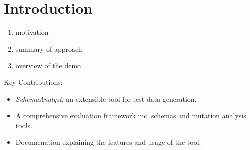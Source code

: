 \section{Introduction}

\begin{enumerate}
\item motivation
\item summary of approach
\item overview of the demo
\end{enumerate}

Key Contributions:
\begin{itemize}
\item \textit{SchemaAnalyst}, an extensible tool for test data generation.
\item A comprehensive evaluation framework inc. schemas and mutation analysis tools.
\item Documenation explaining the features and usage of the tool.
\end{itemize}
